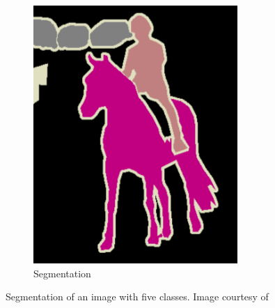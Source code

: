 \begin{figure}[h]
\begin{subfigure}{0.27\textwidth}
                \includegraphics[width=\textwidth]{plots/segmentationTruth.png}
		\caption{Segmentation}
        \end{subfigure}
	\caption[Segmentation of an image]{Segmentation of an image with five classes. Image courtesy of~\cite{Long2015}}
	\label{fig:imageSegmentation}
\end{figure}

